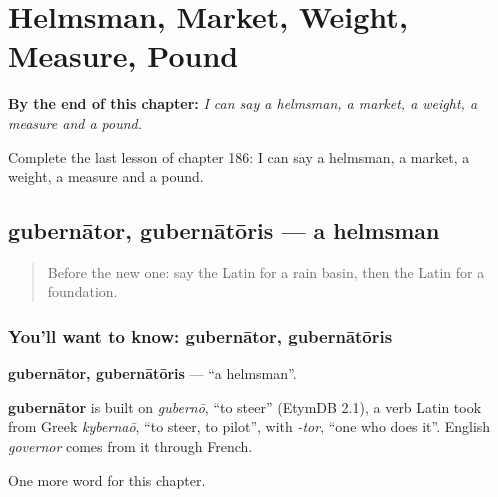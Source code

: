 
\chapter{Helmsman, Market, Weight, Measure, Pound}
\label{ch:la-helmsman-market-weight-measure-pound}

\begin{chapteropening}
\textbf{By the end of this chapter:} \emph{I can say a helmsman, a market, a weight, a measure and a pound.}

Complete the last lesson of chapter 186: I can say a helmsman, a market, a weight, a measure and a pound.
\end{chapteropening}

\section[gubernātor, gubernātōris]{gubernātor, gubernātōris — a helmsman}

\label{lesson:LA-C186-gubernator}



\begin{quote}
Before the new one: say the Latin for a rain basin, then the Latin for a foundation.
\end{quote}

\subsection*{You'll want to know: gubernātor, gubernātōris}
\textbf{gubernātor, gubernātōris} — \textquotedblleft{}a helmsman\textquotedblright{}.

\begin{cousinweb}
\textbf{gubernātor} is built on \emph{gubernō}, \textquotedblleft{}to steer\textquotedblright{} (EtymDB 2.1), a verb Latin took from Greek \emph{kybernaō}, \textquotedblleft{}to steer, to pilot\textquotedblright{}, with \emph{-tor}, \textquotedblleft{}one who does it\textquotedblright{}. English \emph{governor} comes from it through French.
\end{cousinweb}

\begin{grammarlens}[title={What you've built}]
One more word for this chapter.
\end{grammarlens}

